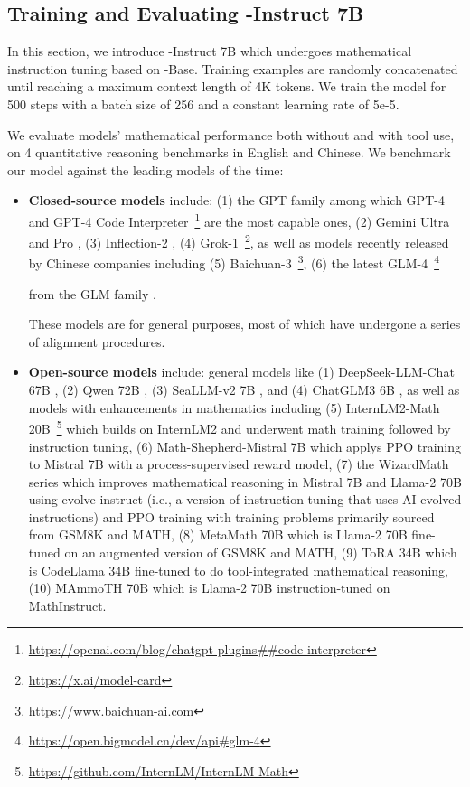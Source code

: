 \subsection{Training and Evaluating \spmath-Instruct 7B}

In this section, we introduce \spmath-Instruct 7B which undergoes mathematical instruction tuning based on \spmath-Base.
Training examples are randomly concatenated until reaching a maximum context length of 4K tokens.
We train the model for 500 steps with a batch size of 256 and a constant learning rate of 5e-5.

We evaluate models' mathematical performance both without and with tool use, on 4 quantitative reasoning benchmarks in English and Chinese.
We benchmark our model against the leading models of the time:
\begin{itemize}[topsep=0pt]
    \item \textbf{Closed-source models} include:
    (1) the GPT family among which GPT-4 \citep{gpt4} and GPT-4 Code Interpreter~\footnote{\url{https://openai.com/blog/chatgpt-plugins\#\#code-interpreter}} are the most capable ones,
    (2) Gemini Ultra and Pro \citep{gemini},
    (3) Inflection-2 \citep{inflection-2},
    (4) Grok-1~\footnote{\url{https://x.ai/model-card}},
    as well as models recently released by Chinese companies including
    (5) Baichuan-3~\footnote{\url{https://www.baichuan-ai.com}},
    (6) the latest GLM-4~\footnote{\url{https://open.bigmodel.cn/dev/api\#glm-4}}
    
    from the GLM family \citep{glm}.
    
    These models are for general purposes, most of which have undergone a series of alignment procedures.
    \item \textbf{Open-source models} include:
    general models like (1) DeepSeek-LLM-Chat 67B \citep{deepseek-llm}, (2) Qwen 72B \citep{qwen}, (3) SeaLLM-v2 7B \citep{seallm}, and (4) ChatGLM3 6B \citep{chatglm3},
    as well as models with enhancements in mathematics including
    (5) InternLM2-Math 20B~\footnote{\url{https://github.com/InternLM/InternLM-Math}} which builds on InternLM2 and underwent math training followed by instruction tuning,
    (6) Math-Shepherd-Mistral 7B which applys PPO training \citep{schulman2017proximal} to Mistral 7B \citep{mistral} with a process-supervised reward model,
    (7) the WizardMath series \citep{wizardmath} which improves mathematical reasoning in Mistral 7B and Llama-2 70B \citep{llama2} using evolve-instruct (i.e., a version of instruction tuning that uses AI-evolved instructions) and PPO training with training problems primarily sourced from GSM8K and MATH,
    (8) MetaMath 70B \citep{metamath} which is Llama-2 70B fine-tuned on an augmented version of GSM8K and MATH,
    (9) ToRA 34B \cite{tora} which is CodeLlama 34B fine-tuned to do tool-integrated mathematical reasoning,
    (10) MAmmoTH 70B \citep{MathInstruct} which is Llama-2 70B instruction-tuned on MathInstruct.
\end{itemize}


